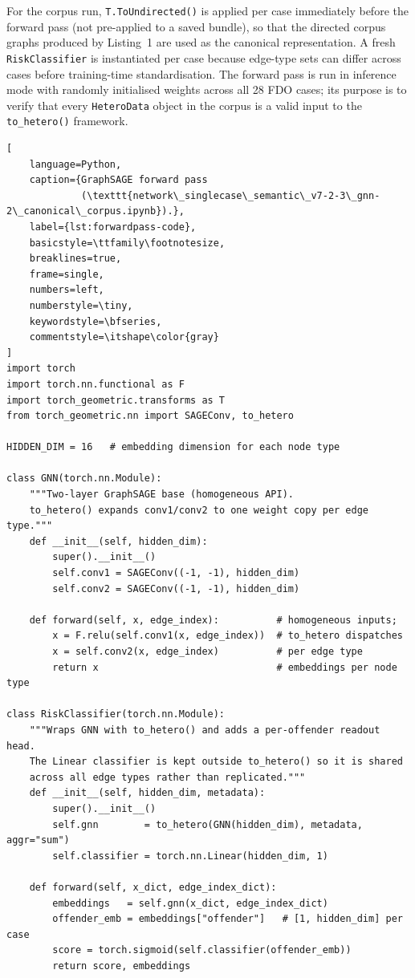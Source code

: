 For the corpus run, \texttt{T.ToUndirected()} is applied per case immediately
before the forward pass (not pre-applied to a saved bundle), so that the
directed corpus graphs produced by Listing~1 are used as the canonical
representation. A fresh \texttt{RiskClassifier} is instantiated per case
because edge-type sets can differ across cases before training-time
standardisation. The forward pass is run in inference mode with randomly
initialised weights across all 28 FDO cases; its purpose is to verify that
every \texttt{HeteroData} object in the corpus is a valid input to the
\texttt{to\_hetero()} framework.

\begin{lstlisting}[
    language=Python,
    caption={GraphSAGE forward pass
             (\texttt{network\_singlecase\_semantic\_v7-2-3\_gnn-2\_canonical\_corpus.ipynb}).},
    label={lst:forwardpass-code},
    basicstyle=\ttfamily\footnotesize,
    breaklines=true,
    frame=single,
    numbers=left,
    numberstyle=\tiny,
    keywordstyle=\bfseries,
    commentstyle=\itshape\color{gray}
]
import torch
import torch.nn.functional as F
import torch_geometric.transforms as T
from torch_geometric.nn import SAGEConv, to_hetero

HIDDEN_DIM = 16   # embedding dimension for each node type

class GNN(torch.nn.Module):
    """Two-layer GraphSAGE base (homogeneous API).
    to_hetero() expands conv1/conv2 to one weight copy per edge type."""
    def __init__(self, hidden_dim):
        super().__init__()
        self.conv1 = SAGEConv((-1, -1), hidden_dim)
        self.conv2 = SAGEConv((-1, -1), hidden_dim)

    def forward(self, x, edge_index):          # homogeneous inputs;
        x = F.relu(self.conv1(x, edge_index))  # to_hetero dispatches
        x = self.conv2(x, edge_index)          # per edge type
        return x                               # embeddings per node type

class RiskClassifier(torch.nn.Module):
    """Wraps GNN with to_hetero() and adds a per-offender readout head.
    The Linear classifier is kept outside to_hetero() so it is shared
    across all edge types rather than replicated."""
    def __init__(self, hidden_dim, metadata):
        super().__init__()
        self.gnn        = to_hetero(GNN(hidden_dim), metadata, aggr="sum")
        self.classifier = torch.nn.Linear(hidden_dim, 1)

    def forward(self, x_dict, edge_index_dict):
        embeddings   = self.gnn(x_dict, edge_index_dict)
        offender_emb = embeddings["offender"]   # [1, hidden_dim] per case
        score = torch.sigmoid(self.classifier(offender_emb))
        return score, embeddings


\end{lstlisting}
